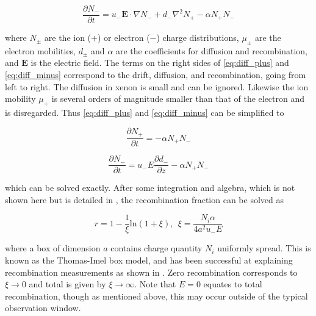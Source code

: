 \begin{equation}
\frac{\partial N_{-}}{\partial t} = u_{-} \mathbf{E} \cdot \nabla N_{-} + d_{-} \nabla^{2} N_{+} - \alpha N_{+} N_{-}
\label{eq:diff_minus}
\end{equation}

\noindent where $N_{\pm}$ are the ion ($+$) or electron ($-$) charge distributions, $\mu_{\pm}$ are the electron mobilities, $d_{\pm}$
and $\alpha$
are the coefficients for diffusion and recombination, and $\mathbf{E}$ is the electric field.  The terms on the right sides of
\eqref{eq:diff_plus} and \eqref{eq:diff_minus} correspond to the drift, diffusion, and recombination, going from left to right.  The
diffusion in xenon is small and can be ignored.  Likewise the ion mobility $\mu_{+}$ is several orders of magnitude smaller than that
of the electron and is disregarded.  Thus \eqref{eq:diff_plus} and \eqref{eq:diff_minus} can be simplified to

\begin{equation}
\frac{\partial N_{+}}{\partial t} = - \alpha N_{+} N_{-}
\label{eq:diff_simple_plus}
\end{equation}

\begin{equation}
\frac{\partial N_{-}}{\partial t} = u_{-} E \frac{\partial d_{-}}{\partial z} - \alpha N_{+} N_{-}
\label{eq:diff_simple_minus}
\end{equation}

\noindent which can be solved exactly.  After some integration and algebra, which is not shown here but is detailed in
, the recombination fraction can be solved as

\begin{equation}
r = 1 - \frac{1}{\xi} \mathrm{ln}(1 + \xi),\ \ \xi = \frac{N_{i} \alpha}{4 a^{2} u_{-} E}
\label{eq:ti_recomb}
\end{equation}

\noindent where a box of dimension $a$ contains charge quantity $N_{i}$ uniformly spread.  This is known as the Thomas-Imel box model,
and has been successful at explaining recombination measurements as shown in .  Zero recombination corresponds to
$\xi \rightarrow 0$ and total is given by $\xi \rightarrow \infty$.  Note that $E = 0$ equates to total recombination, though as
mentioned above, this may occur outside of the typical observation window.

